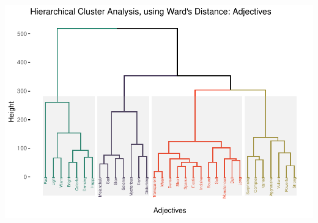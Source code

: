 \documentclass[
]{article}
\begin{document}
\begin{center}\includegraphics{MusDes_Supplementary_files/figure-latex/kmeans4words-1} \end{center}
\end{document}

